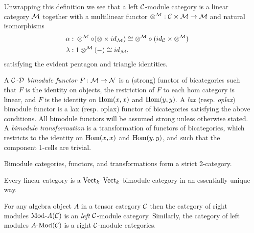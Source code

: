 \documentclass{amsart}
\begin{document}
Unwrapping this definition we see that a left $\mathcal C$-module category is a linear category $\mathcal M$ together with a multilinear functor $\otimes^{\mathcal M}: \mathcal C \times \mathcal M \to \mathcal M$ and natural isomorphisms
	\begin{align*}
		\alpha: & \;    \otimes^{\mathcal M} \circ (\otimes \times id_{\mathcal M}) \cong  \otimes^{\mathcal M} \circ (id_{\mathcal C} \times \otimes^{\mathcal M}) \\
		\lambda: & \; 1 \otimes^{\mathcal M}(-) \cong id_{\mathcal M},
	\end{align*}
	satisfying the evident pentagon and triangle identities. 

\begin{definition}		
A {\em $\mathcal C$-$\mathcal D$ bimodule functor} $F:\mathcal M \to \mathcal N$ is a (strong) functor of bicategories such that 
		 $F$ is the identity on objects,
		  the restriction of $F$ to each hom category is linear,
		 and $F$ is the identity on $\operatorname{Hom}(x,x)$ and $\operatorname{Hom}(y,y)$.
A {\em lax} (resp. {\em oplax}) bimodule functor is a lax (resp. oplax) functor of bicategories satisfying the above conditions. All bimodule functors will be assumed strong unless otherwise stated. 
	A {\em bimodule transformation} is a transformation of functors of bicategories, which restricts to the identity on $\operatorname{Hom}(x,x)$ and $\operatorname{Hom}(y,y)$, and such that the component 1-cells are trivial.  
\end{definition}
	
%
Bimodule categories, functors, and transformations form a strict 2-category.

\begin{example}
	Every linear category is a $\mathrm{Vect}_k$-$\mathrm{Vect}_k$-bimodule category in an essentially unique way. 
\end{example}

\begin{example} \label{ex:ModulesAreModules}
	For any algebra object $A$ in a tensor category $\mathcal C$ then the category of right modules $\Mod{}{A}(\cC)$ is an \emph{left} $\mathcal C$-module category.  Similarly, the category of left modules $\Mod{A}{}(\cC)$ is a right $\mathcal C$-module categories.
\end{example}
\end{document}
